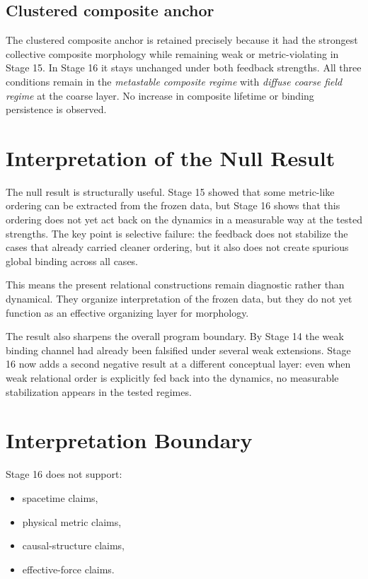 \documentclass[11pt]{article}
\begin{document}
\subsection{Clustered composite anchor}

The clustered composite anchor is retained precisely because it had the strongest collective composite morphology while remaining weak or metric-violating in Stage 15. In Stage 16 it stays unchanged under both feedback strengths. All three conditions remain in the \emph{metastable composite regime} with \emph{diffuse coarse field regime} at the coarse layer. No increase in composite lifetime or binding persistence is observed.

\section{Interpretation of the Null Result}

The null result is structurally useful. Stage 15 showed that some metric-like ordering can be extracted from the frozen data, but Stage 16 shows that this ordering does not yet act back on the dynamics in a measurable way at the tested strengths. The key point is selective failure: the feedback does not stabilize the cases that already carried cleaner ordering, but it also does not create spurious global binding across all cases.

This means the present relational constructions remain diagnostic rather than dynamical. They organize interpretation of the frozen data, but they do not yet function as an effective organizing layer for morphology.

The result also sharpens the overall program boundary. By Stage 14 the weak binding channel had already been falsified under several weak extensions. Stage 16 now adds a second negative result at a different conceptual layer: even when weak relational order is explicitly fed back into the dynamics, no measurable stabilization appears in the tested regimes.

\section{Interpretation Boundary}

Stage 16 does not support:
\begin{itemize}
\item spacetime claims,
\item physical metric claims,
\item causal-structure claims,
\item effective-force claims.
\end{itemize}
\end{document}
